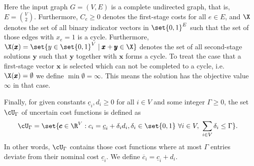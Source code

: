 \documentclass[a4paper,abstracton]{scrartcl}
\begin{document}
Here the input graph $G = (V,E)$ is a complete undirected graph, that is, $E = {V \choose 2}$.
Furthermore, $C_e \geq 0$ denotes the first-stage costs for all $e \in E$, and $\X$ denotes the set of all binary indicator vectors in $\set{0,1}^E$ such that the set of those edges with $x_e=1$ is a  cycle.
 Furthermore, $\X(\pmb x) = \set{y \in \set{0,1}^V \mid \pmb x + \pmb y \in \X}$ denotes the set of all second-stage solutions $\pmb y$ such that $\pmb y$ together with $\pmb x$ forms a  cycle.
 To treat the case that a first-stage vector $\pmb x$ is selected which can not be completed to a  cycle, i.e. $\X(\pmb x) = \emptyset$ we define $\min \emptyset = \infty$.
 This means the solution has the objective value $\infty$ in that case.

Finally, for given constants $\underline{c}_i, d_i \geq 0$ for all $i \in V$ and some integer $\Gamma \geq 0$, the set $\cU_\Gamma$ of uncertain cost functions is defined as
\[
\cU_\Gamma = \set{ \pmb c \in \R^V : c_i = \underline{c}_i + \delta_id_i, \delta_i \in \set{0,1}\ \forall i \in V,\ \sum_{i \in V}\delta_i \leq \Gamma }.
\]
In other words, $\cU_\Gamma$ contains those cost functions where at most $\Gamma$ entries deviate from their nominal cost $\underline{c}_i$. We define $\overline{c}_i = \underline{c}_i + d_i$. 
\end{document}
